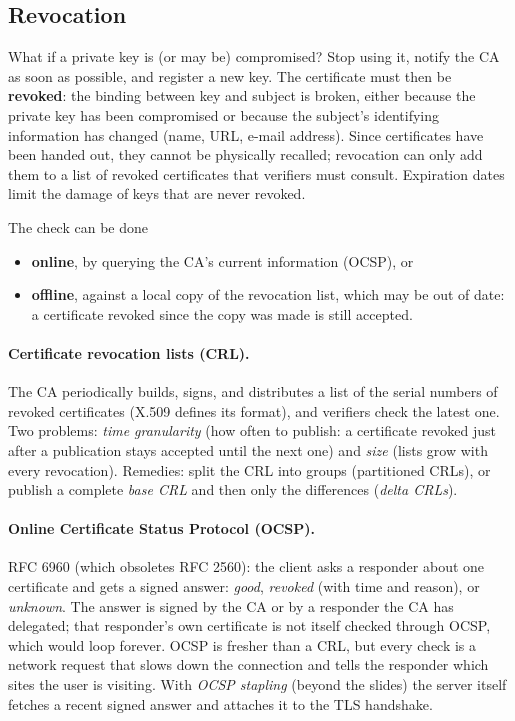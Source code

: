 \subsection{Revocation}

What if a private key is (or may be) compromised? Stop using it, notify the CA as soon as possible, and register a new key. The certificate must then be \textbf{revoked}: the binding between key and subject is broken, either because the private key has been compromised or because the subject's identifying information has changed (name, URL, e-mail address). Since certificates have been handed out, they cannot be physically recalled; revocation can only add them to a list of revoked certificates that verifiers must consult. Expiration dates limit the damage of keys that are never revoked.

The check can be done
\begin{itemize}
    \item \textbf{online}, by querying the CA's current information (OCSP), or
    \item \textbf{offline}, against a local copy of the revocation list, which may be out of date: a certificate revoked since the copy was made is still accepted.
\end{itemize}

\paragraph{Certificate revocation lists (CRL).} The CA periodically builds, signs, and distributes a list of the serial numbers of revoked certificates (X.509 defines its format), and verifiers check the latest one. Two problems: \emph{time granularity} (how often to publish: a certificate revoked just after a publication stays accepted until the next one) and \emph{size} (lists grow with every revocation). Remedies: split the CRL into groups (partitioned CRLs), or publish a complete \emph{base CRL} and then only the differences (\emph{delta CRLs}).

\paragraph{Online Certificate Status Protocol (OCSP).} RFC 6960 (which obsoletes RFC 2560): the client asks a responder about one certificate and gets a signed answer: \emph{good}, \emph{revoked} (with time and reason), or \emph{unknown}. The answer is signed by the CA or by a responder the CA has delegated; that responder's own certificate is not itself checked through OCSP, which would loop forever. OCSP is fresher than a CRL, but every check is a network request that slows down the connection and tells the responder which sites the user is visiting. With \emph{OCSP stapling} (beyond the slides) the server itself fetches a recent signed answer and attaches it to the TLS handshake.

